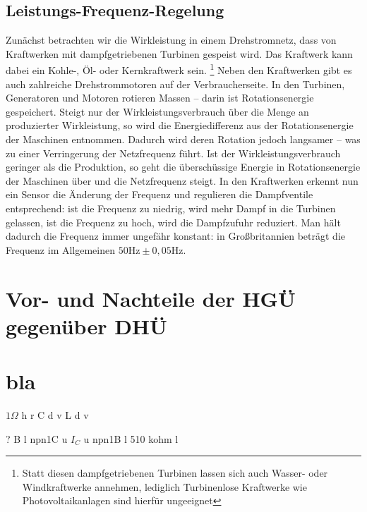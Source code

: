\documentclass[10pt,a4paper]{article}
\newcommand{\q}{\glqq }
\begin{document}
\subsection{Leistungs-Frequenz-Regelung}
Zunächst betrachten wir die Wirkleistung in einem Drehstromnetz, dass von Kraftwerken mit dampfgetriebenen Turbinen gespeist wird. Das Kraftwerk kann dabei ein Kohle-, Öl- oder Kernkraftwerk sein. \footnote{Statt diesen dampfgetriebenen Turbinen lassen sich auch Wasser- oder Windkraftwerke annehmen, lediglich Turbinenlose Kraftwerke wie Photovoltaikanlagen sind hierfür ungeeignet} %
Neben den Kraftwerken gibt es auch zahlreiche Drehstrommotoren auf der \q Verbraucherseite\q. %
In den Turbinen, Generatoren und Motoren rotieren Massen – darin ist Rotationsenergie gespeichert.
Steigt nur der Wirkleistungsverbrauch über die Menge an produzierter Wirkleistung, so wird die Energiedifferenz aus der Rotationsenergie der Maschinen entnommen.
Dadurch wird deren Rotation jedoch langsamer – was zu einer Verringerung der Netzfrequenz führt.
Ist der Wirkleistungsverbrauch geringer als die Produktion, so geht die überschüssige Energie in Rotationsenergie der Maschinen über und die Netzfrequenz steigt.
In den Kraftwerken erkennt nun ein Sensor die Änderung der Frequenz und regulieren die Dampfventile entsprechend:
ist die Frequenz zu niedrig, wird mehr Dampf in die Turbinen gelassen, ist die Frequenz zu hoch, wird die Dampfzufuhr reduziert.
Man hält dadurch die Frequenz immer ungefähr konstant: in Großbritannien beträgt die Frequenz im Allgemeinen $50 \mathrm{Hz} \pm 0,05 \mathrm{Hz}$.\cite{Harrison} %

\section{Vor- und Nachteile der HGÜ gegenüber DHÜ}



\section*{bla}
\begin{circuit}{2}
 {$1 \Omega$} h
 r
 C d
 v
\nl{} {L} d 
\nl{} v
\end{circuit}

\begin{circuit}{0}
 {?} B l
\frompin npn1C
 u
\nl{} {$I_C$} u
\atpin npn1B
 l
 {510 kohm} l
\end{circuit}


{}

\end{document}
